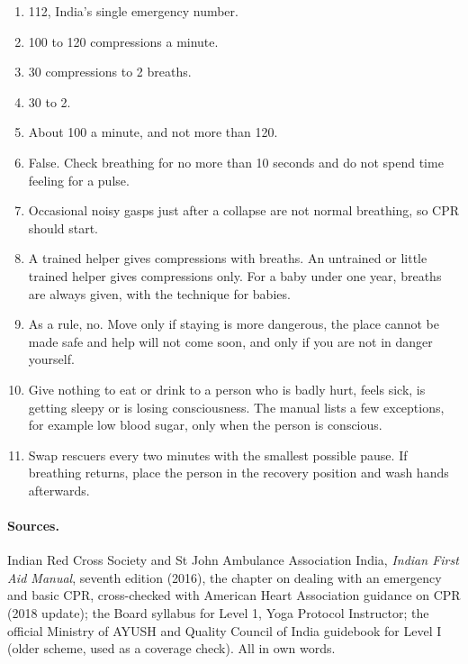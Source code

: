 \begin{enumerate}
\item 112, India's single emergency number.
\item 100 to 120 compressions a minute.
\item 30 compressions to 2 breaths.
\item 30 to 2.
\item About 100 a minute, and not more than 120.
\item False. Check breathing for no more than 10 seconds and do not spend time feeling for a pulse.
\item Occasional noisy gasps just after a collapse are not normal breathing, so CPR should start.
\item A trained helper gives compressions with breaths. An untrained or little trained helper gives compressions only. For a baby under one year, breaths are always given, with the technique for babies.
\item As a rule, no. Move only if staying is more dangerous, the place cannot be made safe and help will not come soon, and only if you are not in danger yourself.
\item Give nothing to eat or drink to a person who is badly hurt, feels sick, is getting sleepy or is losing consciousness. The manual lists a few exceptions, for example low blood sugar, only when the person is conscious.
\item Swap rescuers every two minutes with the smallest possible pause. If breathing returns, place the person in the recovery position and wash hands afterwards.
\end{enumerate}

\paragraph{Sources.} Indian Red Cross Society and St John Ambulance Association India, \emph{Indian First Aid Manual}, seventh edition (2016), the chapter on dealing with an emergency and basic CPR, cross-checked with American Heart Association guidance on CPR (2018 update); the Board syllabus for Level 1, Yoga Protocol Instructor; the official Ministry of AYUSH and Quality Council of India guidebook for Level I (older scheme, used as a coverage check). All in own words.
